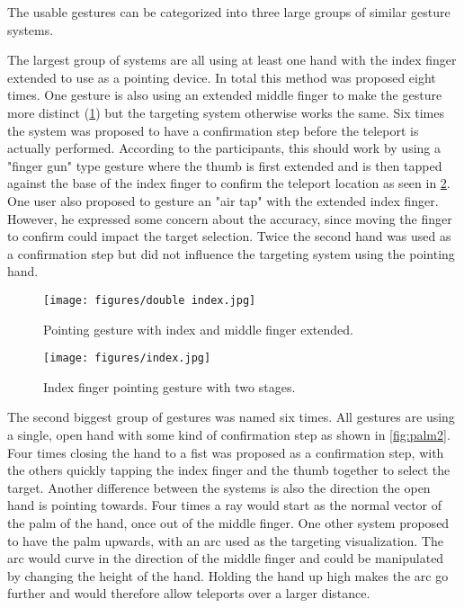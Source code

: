 The usable gestures can be categorized into three large groups of similar gesture systems. 

The largest group of systems are all using at least one hand with the index finger extended to use as a pointing device. In total this method was proposed eight times. One gesture is also using an extended middle finger to make the gesture more distinct (\ref{fig:index2}) but the targeting system otherwise works the same. Six times the system was proposed to have a confirmation step before the teleport is actually performed. According to the participants, this should work by using a "finger gun" type gesture where the thumb is first extended and is then tapped against the base of the index finger to confirm the teleport location as seen in \ref{fig:index}. One user also proposed to gesture an "air tap" with the extended index finger. However, he expressed some concern about the accuracy, since moving the finger to confirm could impact the target selection. Twice the second hand was used as a confirmation step but did not influence the targeting system using the pointing hand.

\begin{figure}[!ht]
    \centering
    \texttt{[image: figures/double index.jpg]}
    \caption{Pointing gesture with index and middle finger extended.}
    \label{fig:index2}
\end{figure}

\begin{figure}[!ht]
    \centering
    \texttt{[image: figures/index.jpg]}
    \caption{Index finger pointing gesture with two stages.}
    \label{fig:index}
\end{figure}


The second biggest group of gestures was named six times. All gestures are using a single, open hand with some kind of confirmation step as shown in \ref{fig:palm2}. Four times closing the hand to a fist was proposed as a confirmation step, with the others quickly tapping the index finger and the thumb together to select the target. Another difference between the systems is also the direction the open hand is pointing towards. Four times a ray would start as the normal vector of the palm of the hand, once out of the middle finger. One other system proposed to have the palm upwards, with an arc used as the targeting visualization. The arc would curve in the direction of the middle finger and could be manipulated by changing the height of the hand. Holding the hand up high makes the arc go further and would therefore allow teleports over a larger distance.

